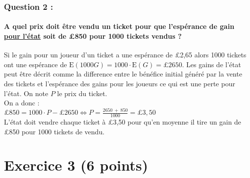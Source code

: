 \documentclass[a4paper, 12pt]{article}
\begin{document}
{}
\subsubsection*{Question 2 :}
\paragraph*{A quel prix doit être vendu un ticket pour que l'espérance de gain \underline{pour l'état} soit de £850 pour 1000 tickets vendus ?\\[5mm]}

Si le gain pour un joueur d'un ticket a une espérance de £2,65 alors 1000 tickets ont une espérance de $\text{E}(1000G) = 1000\cdot \text{E}(G) = \pounds 2650$. 
Les gains de l'état peut être décrit comme la difference entre le bénéfice initial généré par la vente des tickets et l'espérance des gains pour les joueurs ce qui est une perte pour l'état.
On note $P$ le prix du ticket. \\
On a donc : \\
$\pounds 850 = 1000 \cdot P - \pounds 2650 \Leftrightarrow P = \frac{2650\ +\ 850}{1000} = \pounds 3,50$ \\
L'état doit vendre chaque ticket à £3,50 pour qu'en moyenne il tire un gain de £850 pour 1000 tickets de vendu.
\vspace{1cm}

{}
\section*{Exercice 3 (6 points)}
\end{document}
